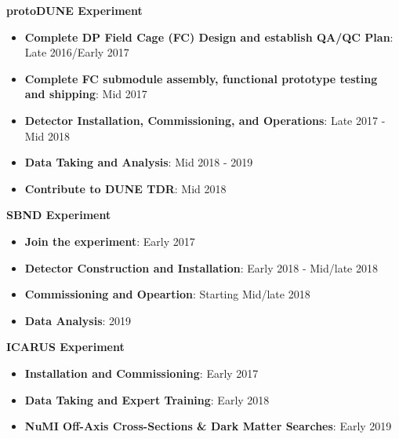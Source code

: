 \noindent\textbf{protoDUNE Experiment}
\begin{itemize}[noitemsep,nolistsep]
\item{\textbf{Complete DP Field Cage (FC) Design and establish QA/QC Plan}}: Late 2016/Early 2017
\item{\textbf{Complete FC submodule assembly, functional prototype testing and shipping}}: Mid 2017
\item{\textbf{Detector Installation, Commissioning, and Operations}}: Late 2017 - Mid 2018
\item{\textbf{Data Taking and Analysis}}: Mid 2018 - 2019
\item{\textbf{Contribute to DUNE TDR}}: Mid 2018
\end{itemize}

\noindent\textbf{SBND Experiment}
\begin{itemize}[noitemsep,nolistsep]
\item{\textbf{Join the experiment}}: Early 2017
\item{\textbf{Detector Construction and Installation}}: Early 2018 - Mid/late 2018
\item{\textbf{Commissioning and Opeartion}}: Starting Mid/late 2018 
\item{\textbf{Data Analysis}}: 2019
\end{itemize}

\noindent\textbf{ICARUS Experiment}
\begin{itemize}[noitemsep,nolistsep]
\item{\textbf{Installation and Commissioning}}: Early 2017
\item{\textbf{Data Taking and Expert Training}}: Early 2018
\item{\textbf{NuMI Off-Axis Cross-Sections \& Dark Matter Searches}}: Early 2019
\end{itemize}

